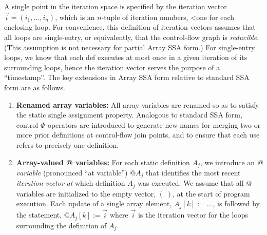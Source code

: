 A single point in the
iteration space is specified by the iteration vector
$\vec{i} = (i_1, \ldots, i_n)$, which is
an 
$n$-tuple of iteration numbers,
<one for each enclosing loop. 
For convenience, this definition of iteration vectors assumes that  
all loops are single-entry, or equivalently, that the control-flow graph is {\it reducible}.
(This assumption is not necessary
for partial Array SSA form.)
For single-entry loops, we know that each def executes at most
once in a given iteration of its surrounding loops, hence the iteration vector
serves the purpose of a ``timestamp''.
The key extensions in Array SSA form relative to standard SSA form are as
follows.



\begin{enumerate}
\item {\bf Renamed array variables:}
All array variables are renamed so as to 
satisfy the static single assignment property.  Analogous to standard SSA
form, control $\Phi$ operators are introduced to generate new names
for merging two or more prior definitions at control-flow join points, and to ensure that each use
refers to precisely one definition.

\item {\bf Array-valued @ variables:}
For each static definition
$A_j$, we introduce an {\em @ variable} (pronounced ``at variable'')
$@A_j$ that identifies
the most recent {\em iteration vector} {\it
at} which definition $A_j$ was executed.
We assume that all @ variables are initialized to the empty
vector, $ (\;)$, at the start of program execution.  
Each update of a single array element, $A_j[k] := \ldots$, 
is followed by the statement, $@A_j[k] := \vec{i}$
where $\vec{i}$ is the iteration vector for the loops surrounding
the definition of $A_j$.



\end{enumerate}

